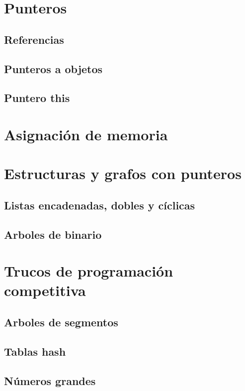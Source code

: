 \documentclass{article}
\begin{document}
\section{Punteros}

\subsection{Referencias}

\subsection{Punteros a objetos}

\subsection{Puntero this}

\section{Asignación de memoria}

\section{Estructuras y grafos con punteros}

\subsection{Listas encadenadas, dobles y cíclicas}

\subsection{Arboles de binario}

\section{Trucos de programación competitiva}

\subsection{Arboles de segmentos}

\subsection{Tablas hash}

\subsection{Números grandes}
\end{document}
